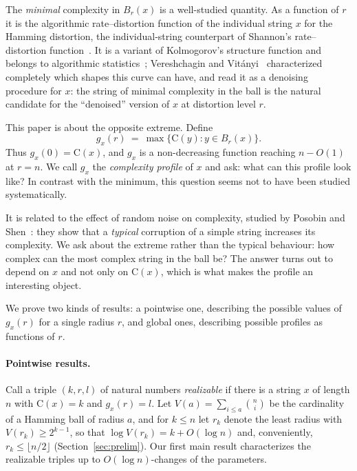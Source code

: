 \documentclass[11pt,a4paper]{article}
\theoremstyle{definition}
\newcommand{\C}{\mathrm{C}}
\renewcommand{\le}{\leqslant}
\renewcommand{\ge}{\geqslant}
\begin{document}
The \emph{minimal} complexity in $B_r(x)$ is a well-studied quantity. As a
function of $r$ it is the algorithmic rate--distortion function of the
individual string $x$ for the Hamming distortion, the individual-string
counterpart of Shannon's rate--distortion function~\cite{Shannon59,CT06}. It is
a variant of Kolmogorov's structure function and belongs to algorithmic
statistics~\cite{GTV01,VV04,VS17}; Vereshchagin and Vit\'anyi~\cite{VV10}
characterized completely which shapes this curve can have, and read it as a
denoising procedure for $x$: the string of minimal complexity in the ball is the
natural candidate for the ``denoised'' version of $x$ at distortion level $r$.

This paper is about the opposite extreme. Define
\[
  g_x(r)\ =\ \max\{\C(y): y\in B_r(x)\}.
\]
Thus $g_x(0)=\C(x)$, and $g_x$ is a non-decreasing function reaching $n-O(1)$ at
$r=n$. We call $g_x$ the \emph{complexity profile} of $x$ and ask: what can this
profile look like? In contrast with the minimum, this question seems not to have
been studied systematically.

It is related to the effect of random noise on complexity, studied by Posobin
and Shen~\cite{PS19}: they show that a \emph{typical} corruption of a simple
string increases its complexity. We ask about the extreme rather than the
typical behaviour: how complex can the most complex string in the ball be? The
answer turns out to depend on $x$ and not only on $\C(x)$, which is what makes
the profile an interesting object.

We prove two kinds of results: a pointwise one, describing the possible values
of $g_x(r)$ for a single radius $r$, and global ones, describing possible
profiles as functions of $r$.

\paragraph{Pointwise results.}
Call a triple $(k,r,l)$ of natural numbers \emph{realizable} if there is a
string $x$ of length $n$ with $\C(x)=k$ and $g_x(r)=l$. Let
$V(a)=\sum_{i\le a}\binom ni$ be the cardinality of a Hamming ball of radius
$a$, and for $k\le n$ let $r_k$ denote the least radius with
$V(r_k)\ge2^{k-1}$, so that $\log V(r_k)=k+O(\log n)$ and, conveniently,
$r_k\le\lfloor n/2\rfloor$ (Section~\ref{sec:prelim}). Our first main
result characterizes the realizable triples up to $O(\log n)$-changes of the
parameters.
\end{document}
